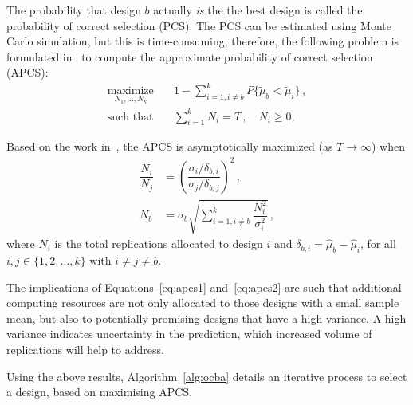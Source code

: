 \documentclass[journal]{IEEEtran}
\begin{document}
The probability that design $b$ actually \emph{is} the the best design is called the probability of correct selection (PCS).
The PCS can be estimated using Monte Carlo simulation, but this is time-consuming; therefore, the following problem is formulated in~\cite{chen2011stochastic} to compute the approximate probability of correct selection (APCS):
\begin{align}
\underset{N_1,\dots,N_k}{\text{maximize}}&\quad 1 - \displaystyle\sum^k_{i=1,i\neq b}P\{\tilde\mu_b < \tilde\mu_i\}\,,\nonumber\\
\text{such that}& \quad \displaystyle\sum^k_{i=1}N_i = T\,, \quad N_i \geq 0,
\end{align}

Based on the work in~\cite{chen2011stochastic}, the APCS is asymptotically maximized (as $T \to \infty$) when
\begin{align}
\dfrac{N_i}{N_j} &= \left(\dfrac{\sigma_i/\delta_{b,i}}{\sigma_j/\delta_{b,j}}\right)^2\,,\label{eq:apcs1}\\[0.2cm]
N_b &= \sigma_b \sqrt{\displaystyle\sum^k_{i=1,i\neq b}\dfrac{N_i^2}{\sigma_i^2}}\,,\label{eq:apcs2}
\end{align}
where $N_i$ is the total replications allocated to design $i$ and $\delta_{b,i} = \hat{\mu}_b - \hat{\mu}_i$, for all $i,j\in \{1,2,\dots,k\}$ with $i \neq j \neq b$.

The implications of Equations~\ref{eq:apcs1} and~\ref{eq:apcs2} are such that additional computing resources are not only allocated to those designs with a small sample mean, but also to potentially promising designs that have a high variance. A high variance indicates uncertainty in the prediction, which increased volume of replications will help to address.

Using the above results, Algorithm~\ref{alg:ocba} details an iterative process to select a design, based on maximising APCS.
\end{document}
